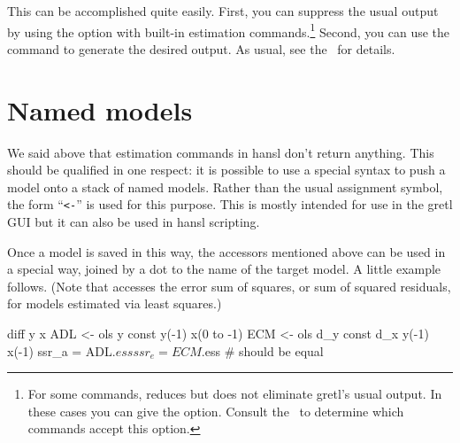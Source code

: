 This can be accomplished quite easily. First, you can suppress the
usual output by using the  option with built-in
estimation commands.\footnote{For some commands, 
  reduces but does not eliminate gretl's usual output. In these cases
  you can give the  option. Consult the \GCR\ to
  determine which commands accept this option.} Second, you can
use the  command to generate the desired output.
As usual, see the \GCR\ for details.

\section{Named models}

We said above that estimation commands in hansl don't return
anything. This should be qualified in one respect: it is possible to
use a special syntax to push a model onto a stack of named models.
Rather than the usual assignment symbol, the form ``\verb|<-|'' is
used for this purpose. This is mostly intended for use in the gretl
GUI but it can also be used in hansl scripting.

Once a model is saved in this way, the accessors mentioned above can
be used in a special way, joined by a dot to the name of the target
model. A little example follows. (Note that  accesses the
error sum of squares, or sum of squared residuals, for models
estimated via least squares.)

\begin{code}
diff y x
ADL <- ols y const y(-1) x(0 to -1)
ECM <- ols d_y const d_x y(-1) x(-1)
ssr_a = ADL.$ess
ssr_e = ECM.$ess # should be equal
\end{code}

\label{LastPage}


